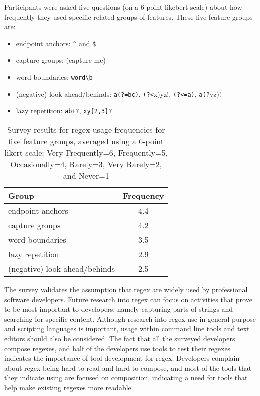 Participants were asked five questions (on a 6-point likebert scale) about how frequently they used specific related groups of features.  These five feature groups are:
\begin{itemize}
    \item endpoint anchors: \verb!^! and \verb!$!
    \item capture groups: (capture me)
    \item word boundaries: \verb!word\b!
    \item (negative) look-ahead/behinds: \verb!a(?=bc)!, \verb!(?<!x)yz!, \verb!(?<=a)!, \verb!a(?!yz)!
    \item lazy repetition: \verb!ab+?!, \verb!xy{2,3}?!
\end{itemize}

\begin{table}
\caption{Survey results for regex usage frequencies for five feature groups, averaged using a 6-point likert scale: Very Frequently=6, Frequently=5, Occasionally=4, Rarely=3, Very Rarely=2, and Never=1 \label{tab:regexfeaturegroups}}
\begin{center}
\begin{tabular}{l|c}
Group & Frequency \\ \hline
endpoint anchors & 4.4\\
capture groups & 4.2 \\
word boundaries & 3.5 \\
lazy repetition & 2.9\\
(negative) look-ahead/behinds & 2.5\\


\end{tabular}
\end{center}
\end{table}

The survey validates the assumption that regex are widely used by professional software developers.  Future research into regex can focus on activities that prove to be most important to developers, namely capturing parts of strings and searching for specific content.  Although research into regex use in general purpose and scripting languages is important, usage within command line tools and text editors should also be considered.  The fact that all the surveyed developers compose regexes, and half of the developers use tools to test their regexes indicates the importance of tool development for regex.  Developers complain about regex being hard to read and hard to compose, and most of the tools that they indicate using are focused on composition, indicating a need for tools that help make existing regexes more readable.
